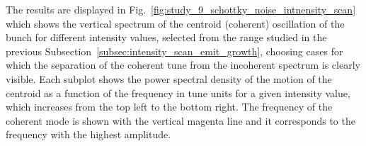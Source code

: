 The results are displayed in Fig.~\ref{fig:study_9_schottky_noise_intnensity_scan} which shows the vertical spectrum of the centroid (coherent) oscillation of the bunch for different intensity values, selected from the range studied in the previous Subsection~\ref{subsec:intensity_scan_emit_growth}, choosing cases for which the separation of the coherent tune from the incoherent spectrum is clearly visible. Each subplot shows the power spectral density of the motion of the centroid as a function of the frequency in tune units for a given intensity value, which increases from the top left to the bottom right. The frequency of the coherent mode is shown with the vertical magenta line and it corresponds to the frequency with the highest amplitude.

